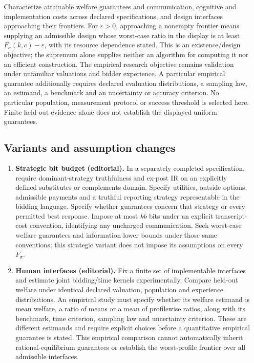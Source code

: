 \documentclass[11pt,a4paper]{article}
\begin{document}
Characterize attainable welfare guarantees and communication, cognitive and implementation costs across declared specifications, and design interfaces approaching their frontiers. For \(\varepsilon>0\), approaching a nonempty frontier means supplying an admissible design whose worst-case ratio in the display is at least \(F_\sigma(k,c)-\varepsilon\), with its resource dependence stated. This is an existence/design objective; the supremum alone supplies neither an algorithm for computing it nor an efficient construction. The empirical research objective remains validation under unfamiliar valuations and bidder experience. A particular empirical guarantee additionally requires declared evaluation distributions, a sampling law, an estimand, a benchmark and an uncertainty or accuracy criterion. No particular population, measurement protocol or success threshold is selected here. Finite held-out evidence alone does not establish the displayed uniform guarantees.
\subsection*{Variants and assumption changes}
\begin{enumerate}
\item \textbf{Strategic bit budget (editorial).} In a separately completed specification, require dominant-strategy truthfulness and ex-post IR on an explicitly defined substitutes or complements domain. Specify utilities, outside options, admissible payments and a truthful reporting strategy representable in the bidding language. Specify whether guarantees concern that strategy or every permitted best response. Impose at most \(kb\) bits under an explicit transcript-cost convention, identifying any uncharged communication. Seek worst-case welfare guarantees and information lower bounds under those same conventions; this strategic variant does not impose its assumptions on every \(F_\sigma\).
\item \textbf{Human interfaces (editorial).} Fix a finite set of implementable interfaces and estimate joint bidding/time kernels experimentally. Compare held-out welfare under identical declared valuation, population and experience distributions. An empirical study must specify whether its welfare estimand is mean welfare, a ratio of means or a mean of profilewise ratios, along with its benchmark, time criterion, sampling law and uncertainty criterion. These are different estimands and require explicit choices before a quantitative empirical guarantee is stated. This empirical comparison cannot automatically inherit rational-equilibrium guarantees or establish the worst-profile frontier over all admissible interfaces.
\end{enumerate}
\end{document}
